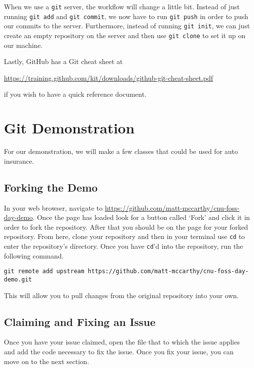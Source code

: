 \documentclass[notitlepage]{simple}
\begin{document}
When we use a \verb|git| server, the workflow will change a little bit.
Instead of just running \verb|git add| and \verb|git commit|, we now have to run \verb|git push| in order to push our commits to the server.
Furthermore, instead of running \verb|git init|, we can just create an empty repository on the server and then use \verb|git clone| to set it up on our machine.

Lastly, GitHub has a Git cheat sheet at
\begin{center}
\url{https://training.github.com/kit/downloads/github-git-cheat-sheet.pdf}
\end{center}
if you wish to have a quick reference document.

\section{Git Demonstration}

For our demonstration, we will make a few classes that could be used for auto insurance.

\subsection{Forking the Demo}

In your web browser, navigate to \url{https://github.com/matt-mccarthy/cnu-foss-day-demo}.
Once the page has loaded look for a button called `Fork' and click it in order to fork the repository.
After that you should be on the page for your forked repository.
From here, clone your repository and then in your terminal use \verb|cd| to enter the repository's directory.
Once you have \verb|cd|'d into the repository, run the following command.
\begin{center}
\verb|git remote add upstream https://github.com/matt-mccarthy/cnu-foss-day-demo.git|
\end{center}
This will allow you to pull changes from the original repository into your own.

\subsection{Claiming and Fixing an Issue}


Once you have your issue claimed, open the file that to which the issue applies and add the code necessary to fix the issue.
Once you fix your issue, you can move on to the next section.
\end{document}
